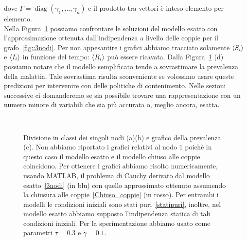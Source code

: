 dove $\Gamma=\operatorname{diag}(\gamma_1, \dots, \gamma_n)$ e il prodotto tra vettori \`e inteso elemento per elemento.\\

Nella Figura~\ref{fig::coppie3nodi} possiamo confrontare le soluzioni del modello esatto con l'approssimazione ottenuta  dall'indipendenza a livello delle coppie per il grafo~\ref{fig::3nodi}. Per non appesantire i grafici abbiamo tracciato solamente  $\langle S_i \rangle$ e $\langle I_i \rangle$ in funzione  del tempo: $\langle  R_i \rangle$ pu\`o essere ricavata.  
Dalla Figura~\ref{fig::coppie3nodi} (d) possiamo notare che il modello semplificato tende a sovrastimare la prevalenza della malattia. Tale sovrastima risulta sconveniente se volessimo usare queste  predizioni per intervenire con delle politiche di contenimento. Nelle sezioni successive ci domanderemo se sia possibile trovare una rappresentazione con un numero minore di variabili che sia pi\`u accurata o, meglio ancora, esatta. 
\begin{figure}[!b]
	\centering
\subfloat[][Nodo 2]{
	 
	} 

\subfloat[][Nodo 3]{
	
	}
\\
\end{figure}
\begin{figure}[t]
\ContinuedFloat
\centering
\subfloat[][Prevalenza.]
{}
\caption[Confronto tra modello esatto e chiuso alle coppie per~\ref{fig::3nodi}]{Divisione in classi dei  singoli nodi (a)(b) e grafico della prevalenza (c). Non abbiamo riportato i grafici relativi al nodo $1$ poich\`e in questo caso il modello esatto e il modello chiuso alle coppie coincidono. Per ottenere i grafici abbiamo risolto numericamente,  usando MATLAB,  il problema di Cauchy derivato dal modello esatto~\eqref{3nodi} (in blu) con quello approssimato  ottenuto   assumendo la chiusura alle coppie~\eqref{Chiuso_coppie} (in rosso).  Per entrambi i modelli le condizioni iniziali sono stati puri~\eqref{statipuri}, inoltre,  nel modello esatto abbiamo supposto l'indipendenza statica di tali condizioni iniziali. Per la sperimentazione abbiamo usato come parametri $\tau=0.3$ e $\gamma=0.1$.\\}
\label{fig::coppie3nodi}
\end{figure}

